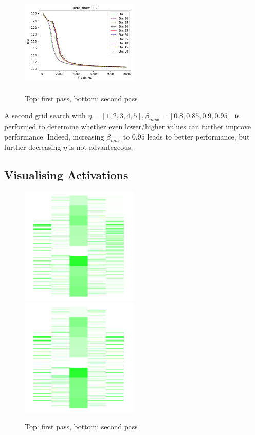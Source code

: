 \documentclass{article}
\begin{document}
\begin{figure}[H]
      \centering
      \includegraphics[width=0.5\textwidth,height=5cm,keepaspectratio]{img/appendix/hyper/betamax08.png}
      
      \caption{Top: first pass, bottom: second pass}
      \label{fig:hyper2}
 \end{figure}
 
A second grid search with $\eta = [1, 2, 3, 4, 5], \beta_{max} = [0.8, 0.85, 0.9, 0.95]$ is performed to determine whether even lower/higher values can further improve performance. Indeed, increasing $\beta_{max}$ to $0.95$ leads to better performance, but further decreasing $\eta$ is not advantegeous. 

\subsection{Visualising Activations} 
\begin{figure}
      \centering
      \includegraphics[width=0.5\textwidth,keepaspectratio]{img/appendix/actvis/firstpass.png}
      \includegraphics[width=0.5\textwidth,keepaspectratio]{img/appendix/actvis/secondpass.png}
      \caption{Top: first pass, bottom: second pass}
      \label{fig:actvis}
  \end{figure}
\end{document}
